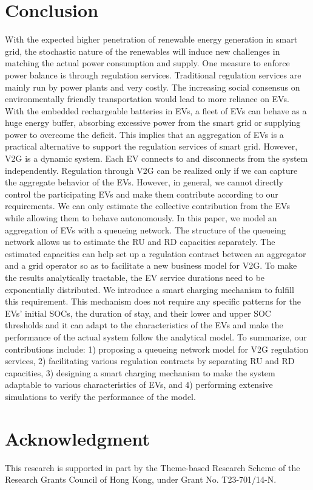 \documentclass[journal]{IEEEtran}
\begin{document}
\section{Conclusion} \label{sec:concl}

With the expected higher penetration of renewable energy generation in smart grid, the
stochastic nature of the renewables will induce new challenges in matching the
actual power consumption and supply.  One measure to enforce power balance is
through regulation services.  
Traditional regulation services are mainly run by power plants and  very costly.  
The increasing social consensus on environmentally friendly transportation
 would lead to more reliance on EVs.  With
the embedded rechargeable batteries in EVs, a fleet of EVs can behave as a huge
energy buffer, absorbing excessive power from the smart grid or
supplying power to overcome the deficit.  This implies that an aggregation of EVs
is a practical alternative to support the regulation services of smart grid.
However, V2G is a dynamic system.  Each EV connects to and disconnects from the
system independently. Regulation through V2G can be realized only if we can capture the aggregate behavior of the EVs. However, in general, we cannot directly control the participating EVs and make them contribute according to our requirements. We can only estimate the collective contribution from the EVs while allowing them to behave autonomously. In this paper, we model an aggregation of EVs with a
queueing network.  The structure of the queueing network allows us to estimate
the RU and RD capacities separately. 
 The estimated capacities can help set up a regulation contract between an aggregator and a
grid operator so as to facilitate a new business model for V2G.
To make the results analytically tractable, the EV service durations need to be exponentially distributed. We introduce a smart charging mechanism to fulfill this requirement.
This mechanism does not require any specific patterns for the EVs' initial SOCs, the duration of stay, and their lower and upper SOC thresholds and it can adapt to the characteristics of the EVs and make the performance of the actual system follow the analytical model. 
To summarize, our contributions include: 1) proposing a queueing network model for V2G regulation services, 2) facilitating various regulation contracts by separating RU and RD capacities, 3) designing a smart charging mechanism to make the system adaptable to various characteristics of EVs, and 4) performing extensive simulations to verify the performance of the model.



\ifCLASSOPTIONcaptionsoff
  \newpage
\fi

\section*{Acknowledgment}
This research is supported in part by the Theme-based Research Scheme of the Research Grants Council of Hong Kong, under Grant No. T23-701/14-N. 



\end{document}
